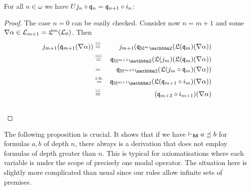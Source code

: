 \documentclass{book}
\begin{document}
\begin{proposition}
\label{p:sq1}
For all $n \in \omega$ we have 
$U j_{n} \circ \mathfrak{q}_n = \mathfrak{q}_{n+1} \circ i_{n}$:\\
\centerline{}
\end{proposition}
\xxviproofspace
\begin{proof}
  The case $n = 0$ can be easily checked.  Consider now $n=m+1$ and
  some $\nabla \alpha \in \mathcal{L}_{m+1} =
  \mathfrak{L}^m(\mathcal{L}_0)$. Then
\begin{eqnarray*}
j_{m+1} (\xxviquo_{m+1} (\xxvinb \alpha )) 
   & \stackrel{\mbox{\tiny (i)}}{=}
   & j_{m+1}(\xxviquo_{\xxviM^{m} \xxvibbtwo}(\xxviLift (\xxviquo_m)(\xxvinb \alpha))
\\ &  \stackrel{\mbox{\tiny (ii)}}{=} 
   & \xxviquo_{\xxviM^{m+1}\xxvibbtwo} (\xxviLift(j_{m})(\xxviLift (\xxviquo_m)(\xxvinb
\alpha)) 
\\ & = & \xxviquo_{\xxviM^{m+1}\xxvibbtwo}	(\xxviLift (j_{m}\circ \xxviquo_m)(\xxvinb
\alpha)) 
\\ & \stackrel{\mbox{\tiny I.H.}}{=}  
   & \xxviquo_{\xxviM^{m+1}\xxvibbtwo}(\xxviLift(\xxviquo_{m+1} \circ
i_{m})(\xxvinb\alpha))	 \\
		 & \stackrel{\mbox{\tiny (i)}}{=} &
		 (\xxviquo_{m+2} \circ i_{m+1}) (\xxvinb \alpha)
	\end{eqnarray*}\vspace{-1cm} \\
	\phantom{blabla} 
\end{proof}

The following proposition
is crucial. 
It shows that if we have
$\vdash_{\mathbf{M}} a \preceq b$ for formulas $a,b$ of depth $n$, there
always is a derivation that does not employ formulas of depth greater
than $n$. This is typical for axiomatisations where each variable is
under the scope of precisely one modal operator. The situation here is
slightly more complicated than usual since our rules allow infinite
sets of premises.
\end{document}
